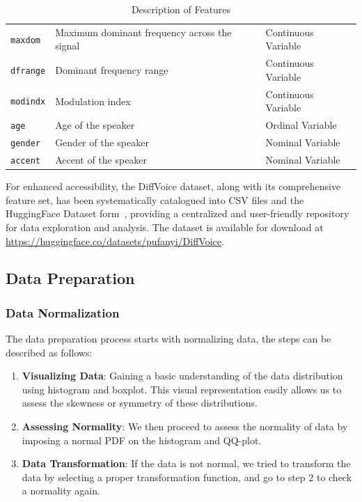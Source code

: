 \documentclass{article}
\begin{document}
{\begin{table}
\begin{tabular}{lll}
				\texttt{maxdom} & Maximum dominant frequency across the signal & Continuous Variable \\
				\texttt{dfrange} & Dominant frequency range & Continuous Variable \\
				\texttt{modindx} & Modulation index & Continuous Variable \\
				\texttt{age} & Age of the speaker & Ordinal Variable \\
				\texttt{gender} & Gender of the speaker & Nominal Variable \\
				\texttt{accent} & Accent of the speaker & Nominal Variable \\
				\hline
			\end{tabular}
			\caption{Description of Features}
			\label{table:features_description}
		\end{table}
	}
	
	For enhanced accessibility, the DiffVoice dataset, along with its comprehensive feature set, has been systematically catalogued into CSV files and the HuggingFace Dataset form~\cite{lhoest2021datasets}, providing a centralized and user-friendly repository for data exploration and analysis. The dataset is available for download at \url{https://huggingface.co/datasets/pufanyi/DiffVoice}.	
	
	\subsection{Data Preparation}
	
	\subsubsection{Data Normalization}
	
	The data preparation process starts with normalizing data, the steps can be described as follows:
	
	\begin{enumerate}
		\item \textbf{Visualizing Data}: Gaining a basic understanding of the data distribution using histogram and boxplot. This visual representation easily allows us to assess the skewness or symmetry of these distributions.
		\item \textbf{Assessing Normality}: We then proceed to assess the normality of data by imposing a normal PDF on the histogram and QQ-plot.
		\item \textbf{Data Transformation}: If the data is not normal, we tried to transform the data by selecting a proper transformation function, and go to step 2 to check a normality again.
	\end{enumerate}
	
\end{document}
